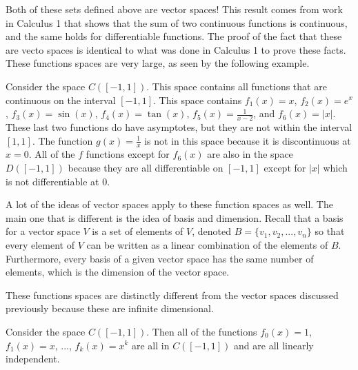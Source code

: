 \documentclass{ximera}
\begin{document}
Both of these sets defined above are vector spaces! This result comes from work in Calculus 1 that shows that the sum of two continuous functions is continuous, and the same holds for differentiable functions. The proof of the fact that these are vecto spaces is identical to what was done in Calculus 1 to prove these facts. These functions spaces are very large, as seen by the following example.

\begin{example}
    Consider the space $C([-1,1])$. This space contains all functions that are continuous on the interval $[-1,1]$. This space contains $f_1(x) = x$, $f_2(x) = e^x$, $f_3(x) = \sin(x)$, $f_4(x) = \tan(x)$, $f_5(x) = \frac{1}{x-2}$, and $f_6(x) = |x|$. These last two functions do have asymptotes, but they are not within the interval $[1,1]$. The function $g(x) = \frac{1}{x}$ is not in this space because it is discontinuous at $x=0$. All of the $f$ functions except for $f_6(x)$ are also in the space $D([-1, 1])$ because they are all differentiable on $[-1,1]$ except for $|x|$ which is not differentiable at $0$. 
\end{example}

A lot of the ideas of vector spaces apply to these function spaces as well. The main one that is different is the idea of basis and dimension. Recall that a basis for a vector space $V$ is a set of elements of $V$, denoted $B = \{v_1, v_2, ..., v_n\}$ so that every element of $V$ can be written as a linear combination of the elements of $B$. Furthermore, every basis of a given vector space has the same number of elements, which is the dimension of the vector space. 

These functions spaces are distinctly different from the vector spaces discussed previously because these are infinite dimensional.

\begin{example}
    Consider the space $C([-1,1])$. Then all of the functions $f_0(x) = 1$, $f_1(x) = x$, ..., $f_k(x) = x^k$ are all in $C([-1,1])$ and are all linearly independent. 
\end{example}
\end{document}
